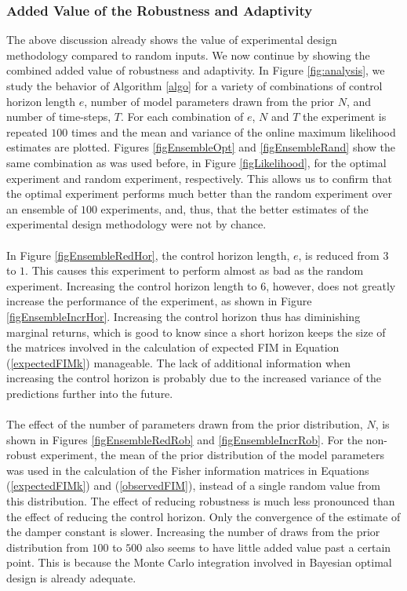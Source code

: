 \subsubsection{Added Value of the Robustness and Adaptivity}
The above discussion already shows the value of experimental design methodology compared to random inputs. We now continue by showing the combined added value of robustness and adaptivity. In Figure \ref{fig:analysis}, we study the behavior of Algorithm \ref{algo} for a variety of combinations of control horizon length $e$, number of model parameters drawn from the prior $N$, and number of time-steps, $T$. For each combination of $e$, $N$ and $T$ the experiment is repeated $100$ times and the mean and variance of the online maximum likelihood estimates are plotted. Figures \ref{figEnsembleOpt} and \ref{figEnsembleRand} show the same combination as was used before, in Figure \ref{figLikelihood}, for the optimal experiment and random experiment, respectively. This allows us to confirm that the optimal experiment performs much better than the random experiment over an ensemble of $100$ experiments, and, thus, that the better estimates of the experimental design methodology were not by chance.
\\
\\
In Figure \ref{figEnsembleRedHor}, the control horizon length, $e$, is reduced from $3$ to $1$. This causes this experiment to perform almost as bad as the random experiment. Increasing the control horizon length to $6$, however, does not greatly increase the performance of the experiment, as shown in Figure \ref{figEnsembleIncrHor}. Increasing the control horizon thus has diminishing marginal returns, which is good to know since a short horizon keeps the size of the matrices involved in the calculation of expected FIM in Equation (\ref{expectedFIMk}) manageable. The lack of additional information when increasing the control horizon is probably due to the increased variance of the predictions further into the future. 
\\
\\
The effect of the number of parameters drawn from the prior distribution, $N$, is shown in Figures \ref{figEnsembleRedRob} and \ref{figEnsembleIncrRob}. For the non-robust experiment, the mean of the prior distribution of the model parameters was used in the calculation of the Fisher information matrices in Equations (\ref{expectedFIMk}) and (\ref{observedFIM}), instead of a single random value from this distribution. The effect of reducing robustness is much less pronounced than the effect of reducing the control horizon. Only the convergence of the estimate of the damper constant is slower. Increasing the number of draws from the prior distribution from $100$ to $500$ also seems to have little added value past a certain point. This is because the Monte Carlo integration involved in Bayesian optimal design is already adequate.
